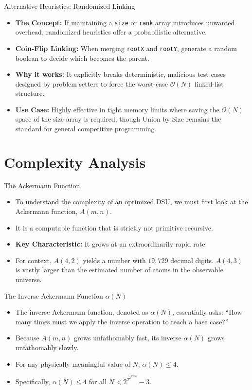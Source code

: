 \documentclass{beamer}
\begin{document}
\begin{frame}{Alternative Heuristics: Randomized Linking}
    \begin{itemize}
        \item \textbf{The Concept:} If maintaining a \texttt{size} or \texttt{rank} array introduces unwanted overhead, randomized heuristics offer a probabilistic alternative.
        \item \textbf{Coin-Flip Linking:} When merging \texttt{rootX} and \texttt{rootY}, generate a random boolean to decide which becomes the parent.
        \item \textbf{Why it works:} It explicitly breaks deterministic, malicious test cases designed by problem setters to force the worst-case $\mathcal{O}(N)$ linked-list structure.
        \item \textbf{Use Case:} Highly effective in tight memory limits where saving the $\mathcal{O}(N)$ space of the size array is required, though Union by Size remains the standard for general competitive programming.
    \end{itemize}
\end{frame}

\section{Complexity Analysis}

\begin{frame}{The Ackermann Function}
    \begin{itemize}
        \item To understand the complexity of an optimized DSU, we must first look at the Ackermann function, $A(m, n)$.
        \item It is a computable function that is strictly not primitive recursive.
        \item \textbf{Key Characteristic:} It grows at an extraordinarily rapid rate.
        \item For context, $A(4, 2)$ yields a number with $19,729$ decimal digits. $A(4, 3)$ is vastly larger than the estimated number of atoms in the observable universe.
    \end{itemize}
\end{frame}

\begin{frame}{The Inverse Ackermann Function $\alpha(N)$}
    \begin{itemize}
        \item The inverse Ackermann function, denoted as $\alpha(N)$, essentially asks: ``How many times must we apply the inverse operation to reach a base case?''
        \item Because $A(m, n)$ grows unfathomably fast, its inverse $\alpha(N)$ grows unfathomably slowly.
        \item For any physically meaningful value of $N$, $\alpha(N) \le 4$.
        \item Specifically, $\alpha(N) \le 4$ for all $N < 2^{2^{2^{65536}}} - 3$.
    \end{itemize}
\end{frame}
\end{document}
